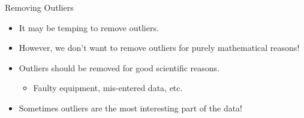 \begin{frame}{Removing Outliers}
    \begin{itemize}
        \item It may be temping to remove outliers.
        \item However, we don't want to remove outliers for purely mathematical reasons!
        \item Outliers should be removed for good scientific reasons.
        \begin{itemize}
            \item Faulty equipment, mis-entered data, etc.
        \end{itemize}
        \item Sometimes outliers are the most interesting part of the data!
    \end{itemize}
\end{frame}
